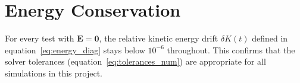 \section{Energy Conservation}
\label{sec:energy_cons}

For every test with $\mathbf{E} = \mathbf{0}$, the relative kinetic energy drift $\delta K(t)$ defined in equation~\eqref{eq:energy_diag} stays below $10^{-6}$ throughout. This confirms that the solver tolerances (equation~\eqref{eq:tolerances_num}) are appropriate for all simulations in this project.